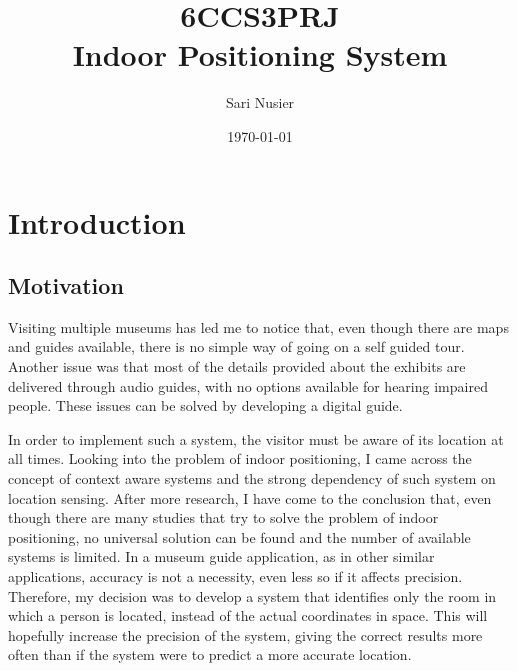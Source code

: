 \documentclass[12pt]{informatics-report}
\title{6CCS3PRJ\\\vspace{0.2cm}Indoor Positioning System}
\author{Sari Nusier}
\date{\today}
\begin{document}
\createFrontMatter
\onehalfspacing
\tableofcontents
\doublespacing


\chapter{Introduction}
\section{Motivation}
Visiting multiple museums has led me to notice that, even though there are maps and guides available, there is no simple way of going on a self guided tour. Another issue was that most of the details provided about the exhibits are delivered through audio guides, with no options available for hearing impaired people. These issues can be solved by developing a digital guide.

In order to implement such a system, the visitor must be aware of its location at all times. Looking into the problem of indoor positioning, I came across the concept of context aware systems and the strong dependency of such system on location sensing. After more research, I have come to the conclusion that, even though there are many studies that try to solve the problem of indoor positioning, no universal solution can be found and the number of available systems is limited. In a museum guide application, as in other similar applications, accuracy is not a necessity, even less so if it affects precision. Therefore, my decision was to develop a system that identifies only the room in which a person is located, instead of the actual coordinates in space. This will hopefully increase the precision of the system, giving the correct results more often than if the system were to predict a more accurate location.
\end{document}
